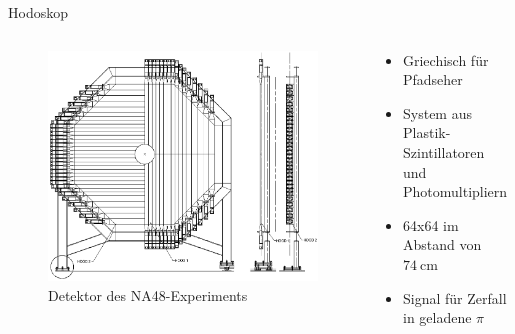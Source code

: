 \documentclass[aspectratio=1610, professionalfonts, 9pt, t]{beamer}
\begin{document}
  \begin{frame}{Hodoskop}
    \begin{columns}[onlytextwidth]
      \begin{column}{0.4\textwidth}
        \begin{figure}[ht]
          \begin{center}
            \vspace*{-1cm}
            \includegraphics[height=0.8\textheight]{Images/na48chodoskop.png} %
            \caption{Detektor des NA48-Experiments}
          \end{center}
        \end{figure}
      \end{column}
      \begin{column}{0.5\textwidth}
        \begin{itemize}
          \item Griechisch für Pfadseher
          \item System aus Plastik-Szintillatoren und Photomultipliern
          \item[\rightarrow] 64x64 im Abstand von $\SI{74}{\centi\metre}$
          \item Signal für Zerfall in geladene $\pi$
        \end{itemize}
      \end{column}
    \end{columns}
  \end{frame}
\end{document}
